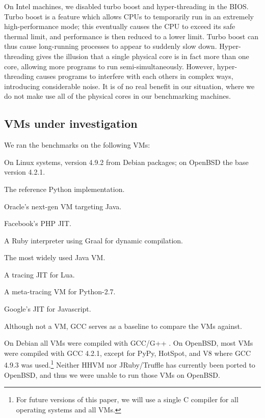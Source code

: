 \documentclass[10pt,preprint]{sigplanconf}
\begin{document}
On Intel machines, we disabled turbo boost and hyper-threading in the BIOS. Turbo boost is a
feature which allows CPUs to temporarily run in an extremely high-performance
mode; this eventually causes the CPU to exceed its safe thermal limit, and
performance is then reduced to a lower limit. Turbo boost can thus cause long-running processes to
appear to suddenly slow down. Hyper-threading gives the illusion that a single
physical core is in fact more than one core, allowing more programs to
run semi-simultaneously. However, hyper-threading causes programs to interfere
with each others in complex ways, introducing considerable noise. It
is of no real benefit in our situation, where we do not make use all of the
physical cores in our benchmarking machines.


\subsection{VMs under investigation}

We ran the benchmarks on the following VMs:
\begin{description*}
\item[GCC] On Linux systems, version 4.9.2 from Debian packages; on OpenBSD the base version 4.2.1.
\item[CPython 2.7.10] The reference Python implementation.
\item[Graal \#9dafd1dc5ff9] Oracle's next-gen VM targeting Java.
\item[HHVM 3.7.1] Facebook's PHP JIT.
\item[JRuby/Truffle \#7f4cd59cdd1c8] A Ruby interpreter using Graal for dynamic compilation.
\item[HotSpot 8u45b14] The most widely used Java VM.
\item[LuaJIT 2.0.4] A tracing JIT for Lua.
\item[PyPy 4.0.0] A meta-tracing VM for Python-2.7.
\item[V8 4.8.271.9] Google's JIT for Javascript.
\end{description*}
Although not a VM, GCC serves as a baseline to compare the VMs against.

On Debian all VMs were compiled with GCC/G++ . On OpenBSD,
most VMs were compiled with GCC 4.2.1, except for PyPy, HotSpot, and V8 where
GCC 4.9.3 was used.\footnote{For future versions of this paper, we will use a
single C compiler for all operating systems and all VMs.} Neither HHVM nor
JRuby/Truffle has currently been ported to OpenBSD, and thus we were unable to
run those VMs on OpenBSD.
\end{document}

